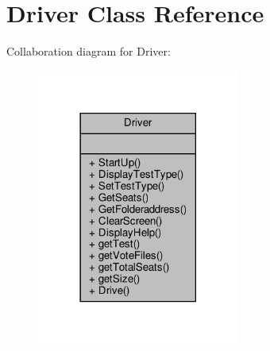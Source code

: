 \hypertarget{classDriver}{}\section{Driver Class Reference}
\label{classDriver}


Collaboration diagram for Driver\+:
\nopagebreak
\begin{figure}[H]
\begin{center}
\leavevmode
\includegraphics[width=189pt]{classDriver__coll__graph}
\end{center}
\end{figure}
